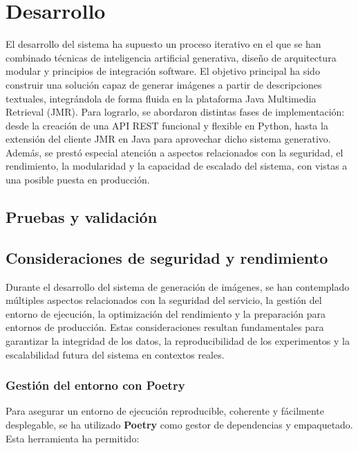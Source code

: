 \section{Desarrollo}
El desarrollo del sistema ha supuesto un proceso iterativo en el que se han combinado técnicas de inteligencia artificial generativa, diseño de arquitectura modular y principios de integración software. El objetivo principal ha sido construir una solución capaz de generar imágenes a partir de descripciones textuales, integrándola de forma fluida en la plataforma Java Multimedia Retrieval (JMR). Para lograrlo, se abordaron distintas fases de implementación: desde la creación de una API REST funcional y flexible en Python, hasta la extensión del cliente JMR en Java para aprovechar dicho sistema generativo. Además, se prestó especial atención a aspectos relacionados con la seguridad, el rendimiento, la modularidad y la capacidad de escalado del sistema, con vistas a una posible puesta en producción.



\subsection{Pruebas y validación}

\subsection{Consideraciones de seguridad y rendimiento}

Durante el desarrollo del sistema de generación de imágenes, se han contemplado múltiples aspectos relacionados con la seguridad del servicio, la gestión del entorno de ejecución, la optimización del rendimiento y la preparación para entornos de producción. Estas consideraciones resultan fundamentales para garantizar la integridad de los datos, la reproducibilidad de los experimentos y la escalabilidad futura del sistema en contextos reales.

\subsubsection{Gestión del entorno con Poetry}

Para asegurar un entorno de ejecución reproducible, coherente y fácilmente desplegable, se ha utilizado \textbf{Poetry} como gestor de dependencias y empaquetado. Esta herramienta ha permitido:

